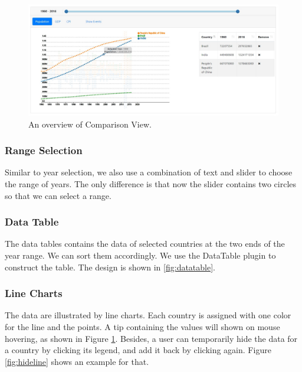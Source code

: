 \documentclass[12pt, fullpage,letterpaper]{article}
\begin{document}
\begin{figure}[h!]
    \begin{center}
        \includegraphics[width=\textwidth]{figs/cvoverview.jpg}
        \caption{An overview of Comparison View.}
        \label{fig:cvoverview}
    \end{center}
\end{figure}

\subsubsection{Range Selection}
Similar to year selection, we also use a combination of text and slider to choose the range of years.
The only difference is that now the slider contains two circles so that we can select a range.

\subsubsection{Data Table}
The data tables contains the data of selected countries at the two ends of the year range.
We can sort them accordingly.
We use the DataTable plugin to construct the table.
The design is shown in \ref{fig:datatable}.

\subsubsection{Line Charts}

The data are illustrated by line charts. Each country is assigned with one color for the line and the points.
A tip containing the values will shown on mouse hovering, as shown in Figure \ref{fig:cvoverview}.
Besides, a user can temporarily hide the data for a country by clicking its legend, and add it back by clicking again.
Figure \ref{fig:hideline} shows an example for that.
\end{document}
